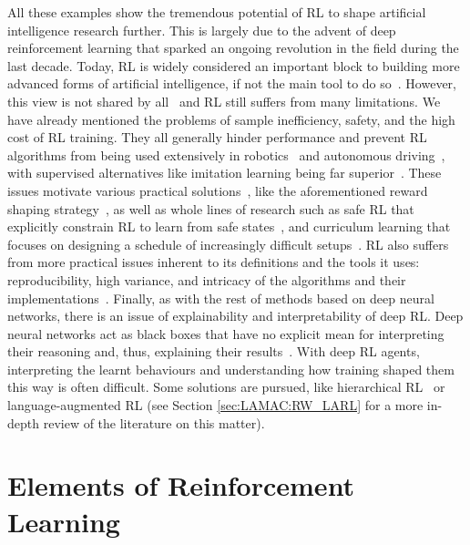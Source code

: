 All these examples show the tremendous potential of RL to shape artificial intelligence research further. This is largely due to the advent of deep reinforcement learning that sparked an ongoing revolution in the field during the last decade. Today, RL is widely considered an important block to building more advanced forms of artificial intelligence, if not the main tool to do so~\citep{Silver2021_RewardEnough}. However, this view is not shared by all~\citep{Mitchell2021_Harder} and RL still suffers from many limitations. We have already mentioned the problems of sample inefficiency, safety, and the high cost of RL training. They all generally hinder performance and prevent RL algorithms from being used extensively in robotics~\citep{Sunderhauf2018_Limits, Ibarz2021_Howto} and autonomous driving~\citep{Kiran2022_DRLDriving, Chen2023_EndToEndDriving}, with supervised alternatives like imitation learning being far superior~\citep{Hester2018_DQNfDemo}. These issues motivate various practical solutions~\citep{Ibarz2021_Howto}, like the aforementioned reward shaping strategy~\citep{Laud2004_Shaping}, as well as whole lines of research such as safe RL that explicitly constrain RL to learn from safe states~\citep{Garcia2015_SafeRL}, and curriculum learning that focuses on designing a schedule of increasingly difficult setups~\citep{Bengio2009_Curriculum, Uchendu2022_Jump}. RL also suffers from more practical issues inherent to its definitions and the tools it uses: reproducibility, high variance, and intricacy of the algorithms and their implementations~\citep{Hendersion2018_Matters}. Finally, as with the rest of methods based on deep neural networks, there is an issue of explainability and interpretability of deep RL. Deep neural networks act as black boxes that have no explicit mean for interpreting their reasoning and, thus, explaining their results~\citep{Rudin2019_StopExplain, Samek2021_ExplainDNN}. With deep RL agents, interpreting the learnt behaviours and understanding how training shaped them this way is often difficult. 
Some solutions are pursued, like hierarchical RL~\citep{Shu2018_Hierarchical, Pateria2021_HRLSurvey, Hafner2022_Hierarchical} or language-augmented RL (see Section \ref{sec:LAMAC:RW_LARL} for a more in-depth review of the literature on this matter).





\section{Elements of Reinforcement Learning}\label{sec:RL:Elements}

